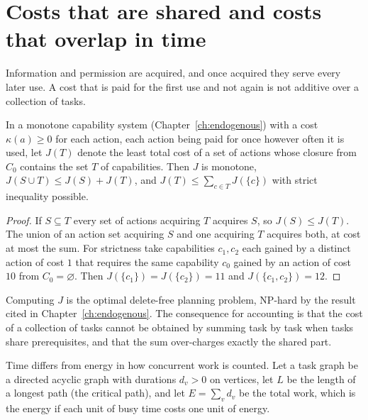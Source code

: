 \section{Costs that are shared and costs that overlap in time}

Information and permission are acquired, and once acquired they serve every later use. A cost that is paid for the first use and not again is not additive over a collection of tasks.

\begin{newresult}\label{prop:subadd}
In a monotone capability system (Chapter~\ref{ch:endogenous}) with a cost $\kappa(a)\ge0$ for each action, each action being paid for once however often it is used, let $J(T)$ denote the least total cost of a set of actions whose closure from $C_0$ contains the set $T$ of capabilities. Then $J$ is monotone, $J(S\cup T)\le J(S)+J(T)$, and $J(T)\le\sum_{c\in T}J(\{c\})$ with strict inequality possible.
\end{newresult}
\begin{proof}
If $S\subseteq T$ every set of actions acquiring $T$ acquires $S$, so $J(S)\le J(T)$. The union of an action set acquiring $S$ and one acquiring $T$ acquires both, at cost at most the sum. For strictness take capabilities $c_1,c_2$ each gained by a distinct action of cost $1$ that requires the same capability $c_0$ gained by an action of cost $10$ from $C_0=\varnothing$. Then $J(\{c_1\})=J(\{c_2\})=11$ and $J(\{c_1,c_2\})=12$.
\end{proof}

Computing $J$ is the optimal delete-free planning problem, NP-hard by the result cited in Chapter~\ref{ch:endogenous}. The consequence for accounting is that the cost of a collection of tasks cannot be obtained by summing task by task when tasks share prerequisites, and that the sum over-charges exactly the shared part.

Time differs from energy in how concurrent work is counted. Let a task graph be a directed acyclic graph with durations $d_v>0$ on vertices, let $L$ be the length of a longest path (the critical path), and let $E=\sum_vd_v$ be the total work, which is the energy if each unit of busy time costs one unit of energy.


